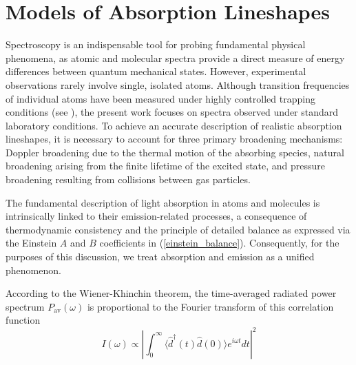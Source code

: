 \documentclass[12pt]{report}
\begin{document}
	\section{Models of Absorption Lineshapes}
	Spectroscopy is an indispensable tool for probing fundamental physical phenomena, as atomic and molecular spectra provide a direct measure of energy differences between quantum mechanical states. However, experimental observations rarely involve single, isolated atoms. Although transition frequencies of individual atoms have been measured under highly controlled trapping conditions (see \cite{ours_single_mg_comb_line}), the present work focuses on spectra observed under standard laboratory conditions. To achieve an accurate description of realistic absorption lineshapes, it is necessary to account for three primary broadening mechanisms: Doppler broadening due to the thermal motion of the absorbing species, natural broadening arising from the finite lifetime of the excited state, and pressure broadening resulting from collisions between gas particles.
	
	The fundamental description of light absorption in atoms and molecules is intrinsically linked to their emission-related processes, a consequence of thermodynamic consistency and the principle of detailed balance as expressed via the Einstein $A$ and $B$ coefficients in (\ref{einstein_balance}). Consequently, for the purposes of this discussion, we treat absorption and emission as a unified phenomenon.
	
	According to the Wiener-Khinchin theorem, the time-averaged radiated power spectrum $P_{\text{av}}(\omega)$ is proportional to the Fourier transform of this correlation function \cite{book_born_and_wolf_princpOptics}
	\begin{equation}
		I(\omega) \propto \left| \int_{0}^{\infty} \langle \hat{d}^\dagger(t)\hat{d}(0) \rangle e^{i\omega t} dt \right|^2
	\end{equation}
	
	
\end{document}
